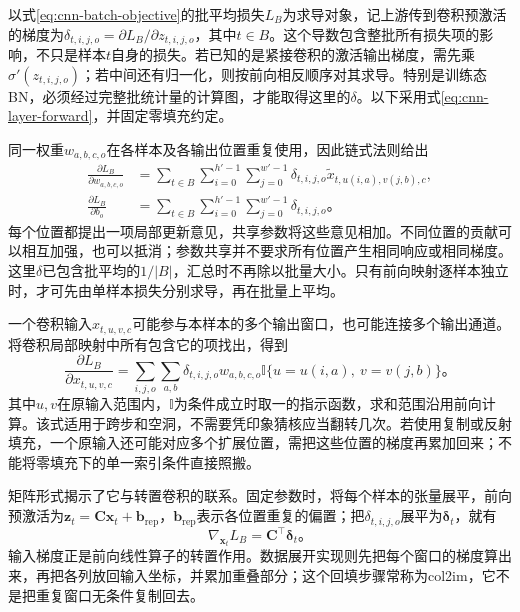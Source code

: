 以式\eqref{eq:cnn-batch-objective}的批平均损失$L_B$为求导对象，记上游传到卷积预激活的梯度为$\delta_{t,i,j,o}=\partial L_B/\partial z_{t,i,j,o}$，其中$t\in B$。这个导数包含整批所有损失项的影响，不只是样本$t$自身的损失。若已知的是紧接卷积的激活输出梯度，需先乘$\sigma'(z_{t,i,j,o})$；若中间还有归一化，则按前向相反顺序对其求导。特别是训练态BN，必须经过完整批统计量的计算图，才能取得这里的$\delta$。以下采用式\eqref{eq:cnn-layer-forward}，并固定零填充约定。

同一权重$w_{a,b,c,o}$在各样本及各输出位置重复使用，因此链式法则给出
\begin{equation}
  \begin{aligned}
    \frac{\partial L_B}{\partial w_{a,b,c,o}}
      &=\sum_{t\in B}\sum_{i=0}^{h'-1}\sum_{j=0}^{w'-1}
         \delta_{t,i,j,o}\widetilde x_{t,u(i,a),v(j,b),c},\\
    \frac{\partial L_B}{\partial b_o}
      &=\sum_{t\in B}\sum_{i=0}^{h'-1}\sum_{j=0}^{w'-1}
         \delta_{t,i,j,o}\text{。}
  \end{aligned}
  \label{eq:cnn-parameter-gradients}
\end{equation}
每个位置都提出一项局部更新意见，共享参数将这些意见相加。不同位置的贡献可以相互加强，也可以抵消；参数共享并不要求所有位置产生相同响应或相同梯度。这里$\delta$已包含批平均的$1/|B|$，汇总时不再除以批量大小。只有前向映射逐样本独立时，才可先由单样本损失分别求导，再在批量上平均。

一个卷积输入$x_{t,u,v,c}$可能参与本样本的多个输出窗口，也可能连接多个输出通道。将卷积局部映射中所有包含它的项找出，得到
\begin{equation}
  \frac{\partial L_B}{\partial x_{t,u,v,c}}
  =\sum_{i,j,o}\sum_{a,b}
    \delta_{t,i,j,o}w_{a,b,c,o}
    \mathbb I\{u=u(i,a),\ v=v(j,b)\}\text{。}
  \label{eq:cnn-input-gradient}
\end{equation}
其中$u,v$在原输入范围内，$\mathbb I$为条件成立时取一的指示函数，求和范围沿用前向计算。该式适用于跨步和空洞，不需要凭印象猜核应当翻转几次。若使用复制或反射填充，一个原输入还可能对应多个扩展位置，需把这些位置的梯度再累加回来；不能将零填充下的单一索引条件直接照搬。

矩阵形式揭示了它与转置卷积的联系。固定参数时，将每个样本的张量展平，前向预激活为$\bm z_t=\bm C\bm x_t+\bm b_{\mathrm{rep}}$，$\bm b_{\mathrm{rep}}$表示各位置重复的偏置；把$\delta_{t,i,j,o}$展平为$\bm\delta_t$，就有
\begin{equation}
  \nabla_{\bm x_t}L_B=\bm C^\top\bm\delta_t\text{。}
  \label{eq:cnn-backprop-transpose}
\end{equation}
输入梯度正是前向线性算子的转置作用。数据展开实现则先把每个窗口的梯度算出来，再把各列放回输入坐标，并累加重叠部分；这个回填步骤常称为col2im，它不是把重复窗口无条件复制回去。

